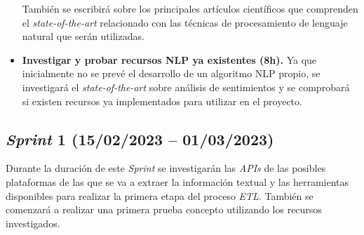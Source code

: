 \begin{itemize}
    También se escribirá sobre los principales artículos científicos que comprenden el \textit{state-of-the-art} relacionado con las técnicas de procesamiento de lenguaje natural que serán utilizadas.

    \item \textbf{Investigar y probar recursos NLP ya existentes (8h).} Ya que inicialmente no se prevé el desarrollo de un algoritmo NLP propio, se investigará el \textit{state-of-the-art} sobre análisis de sentimientos y se comprobará si existen recursos ya implementados para utilizar en el proyecto.

\end{itemize}

\subsection{\textit{Sprint} 1 (15/02/2023 -- 01/03/2023)}

Durante la duración de este \textit{Sprint} se investigarán las \textit{APIs} de las posibles plataformas de las que se va a extraer la información textual y las herramientas disponibles para realizar la primera etapa del proceso \textit{ETL}. También se comenzará a realizar una primera prueba concepto utilizando los recursos investigados.

